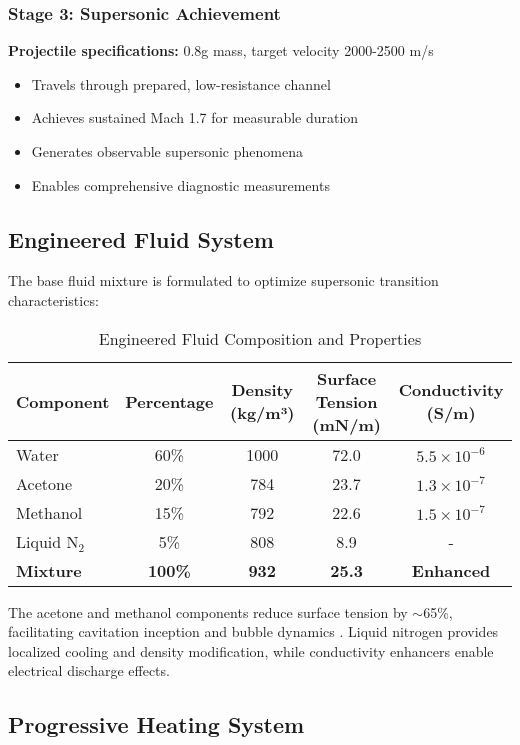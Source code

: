 \documentclass[12pt,a4paper]{article}
\begin{document}
\subsubsection{Stage 3: Supersonic Achievement}
\textbf{Projectile specifications:} 0.8g mass, target velocity 2000-2500 m/s
\begin{itemize}
\item Travels through prepared, low-resistance channel
\item Achieves sustained Mach 1.7 for measurable duration
\item Generates observable supersonic phenomena
\item Enables comprehensive diagnostic measurements
\end{itemize}

\subsection{Engineered Fluid System}

The base fluid mixture is formulated to optimize supersonic transition characteristics:

\begin{table}[H]
\centering
\caption{Engineered Fluid Composition and Properties}
\label{tab:fluid_composition}
\begin{tabular}{lcccc}
\toprule
Component & Percentage & Density (kg/m³) & Surface Tension (mN/m) & Conductivity (S/m) \\
\midrule
Water & 60\% & 1000 & 72.0 & $5.5 \times 10^{-6}$ \\
Acetone & 20\% & 784 & 23.7 & $1.3 \times 10^{-7}$ \\
Methanol & 15\% & 792 & 22.6 & $1.5 \times 10^{-7}$ \\
Liquid N$_2$ & 5\% & 808 & 8.9 & - \\
\midrule
\textbf{Mixture} & \textbf{100\%} & \textbf{932} & \textbf{25.3} & \textbf{Enhanced} \\
\bottomrule
\end{tabular}
\end{table}

The acetone and methanol components reduce surface tension by $\sim$65\%, facilitating cavitation inception and bubble dynamics \cite{blake1987cavitation}. Liquid nitrogen provides localized cooling and density modification, while conductivity enhancers enable electrical discharge effects.

\subsection{Progressive Heating System}
\end{document}
